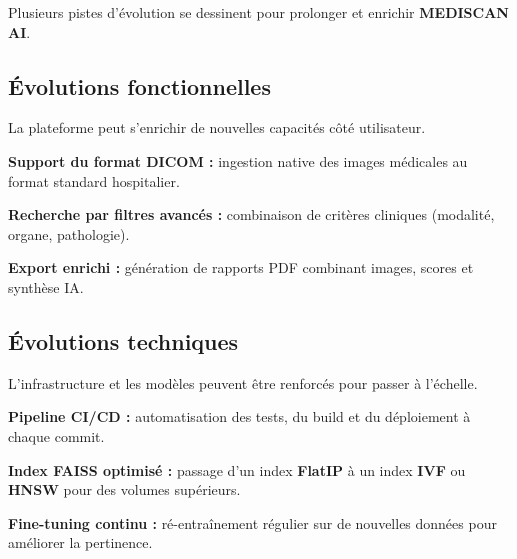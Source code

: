 \documentclass[12pt,a4paper]{article}
\begin{document}
\vspace{0.2cm}
Plusieurs pistes d'évolution se dessinent pour prolonger et enrichir \textbf{MEDISCAN AI}.

\vspace{0.5cm}

\subsection{Évolutions fonctionnelles}

\vspace{0.15cm}
La plateforme peut s'enrichir de nouvelles capacités côté utilisateur.

\vspace{0.15cm}
\begin{sq}
  \item \textbf{Support du format DICOM :} ingestion native des images médicales au format standard hospitalier.
  \item \textbf{Recherche par filtres avancés :} combinaison de critères cliniques (modalité, organe, pathologie).
  \item \textbf{Export enrichi :} génération de rapports PDF combinant images, scores et synthèse IA.
\end{sq}

\vspace{0.5cm}

\subsection{Évolutions techniques}

\vspace{0.15cm}
L'infrastructure et les modèles peuvent être renforcés pour passer à l'échelle.

\vspace{0.15cm}
\begin{sq}
  \item \textbf{Pipeline CI/CD :} automatisation des tests, du build et du déploiement à chaque commit.
  \item \textbf{Index FAISS optimisé :} passage d'un index \textbf{FlatIP} à un index \textbf{IVF} ou \textbf{HNSW} pour des volumes supérieurs.
  \item \textbf{Fine-tuning continu :} ré-entraînement régulier sur de nouvelles données pour améliorer la pertinence.
\end{sq}

\vspace{0.5cm}
\end{document}
